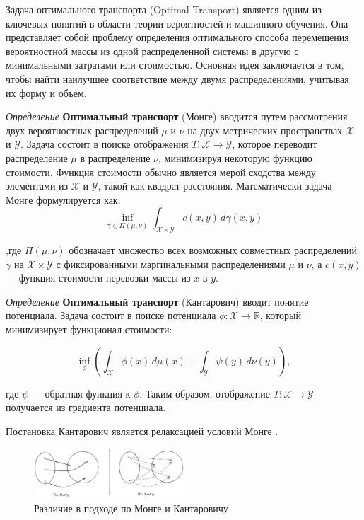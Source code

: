 Задача оптимального транспорта (Optimal Transport)\cite{villani2009optimal} является одним из ключевых понятий 
в области теории вероятностей и машинного обучения.
Она представляет собой проблему определения оптимального способа перемещения вероятностной массы из одной распределенной системы
в другую с минимальными затратами или стоимостью. 
Основная идея заключается в том, чтобы найти наилучшее соответствие между двумя распределениями, учитывая их форму и объем.

\textit{Определение} \textbf{Оптимальный транспорт} (Монге) вводится путем рассмотрения двух вероятностных распределений \( \mu \) и \( \nu \) на двух метрических пространствах \( \mathcal{X} \) и \( \mathcal{Y} \). Задача состоит в поиске отображения \( T: \mathcal{X} \rightarrow \mathcal{Y} \), которое переводит распределение \( \mu \) в распределение \( \nu \), минимизируя некоторую функцию стоимости. Функция стоимости обычно является мерой сходства между элементами из \( \mathcal{X} \) и \( \mathcal{Y} \), такой как квадрат расстояния. Математически задача Монге формулируется как:
$$
    \inf_{\gamma \in \Pi(\mu, \nu)} \int_{\mathcal{X} \times \mathcal{Y}} c(x,y) \, d\gamma(x,y)
$$

,где \( \Pi(\mu, \nu) \) обозначает множество всех возможных совместных распределений 
\( \gamma \) на \( \mathcal{X} \times \mathcal{Y} \) с фиксированными маргинальными
распределениями \( \mu \) и \( \nu \), а \( c(x,y) \) — функция стоимости перевозки массы из \( x \) в \( y \).

\textit{Определение} \textbf{Оптимальный транспорт} (Кантарович) вводит понятие потенциала.
 Задача состоит в поиске потенциала \( \phi: \mathcal{X} \rightarrow \mathbb{R} \), который минимизирует функционал стоимости:

$$
    \inf_{\phi} \left( \int_{\mathcal{X}} \phi(x) \, d\mu(x) + \int_{\mathcal{Y}} \psi(y) \, d\nu(y) \right),
$$

где \( \psi \) — обратная функция к \( \phi \). Таким образом, отображение \( T: \mathcal{X} \rightarrow \mathcal{Y} \) получается из градиента потенциала.

Постановка Кантарович является релаксацией условий Монге .

\begin{figure}[h]
    \centering
    \includegraphics[width=0.5\textwidth]{assets/ml/generation/optimal_transport.excalidraw.png}
    \caption{Различие в подходе по Монге и Кантаровичу}
    \label{opt_transport}
\end{figure}
